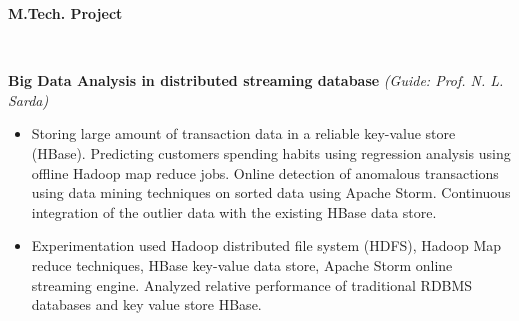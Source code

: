 \documentclass[a4paper,11pt]{article}
\newcommand{\lsep}{-0.5cm}
\newcommand{\resheading}[1]{{\small \colorbox{mygrey}{\begin{minipage}{0.975\textwidth}{\textbf{#1 \vphantom{p\^{E}}}}\end{minipage}}}}
\begin{document}
\resheading{\textbf{\large M.Tech. Project} }\\[\lsep]
\begin{description}
\item  \hspace{0.65 cm} 
 \textbf{Big Data Analysis in distributed streaming database}%
\textit{(Guide: Prof. N. L. Sarda)}
      \begin{itemize}
	  \item Storing large amount of transaction data in a reliable key-value store (HBase). Predicting customers spending habits using regression analysis using offline Hadoop map reduce jobs. Online detection of anomalous transactions using data mining techniques on sorted data using Apache Storm. Continuous integration of the outlier data with the existing HBase data store. 
	  \item Experimentation used Hadoop distributed file system (HDFS), Hadoop Map reduce techniques, HBase key-value data store, Apache Storm online streaming engine. Analyzed relative performance of traditional RDBMS databases and key value store HBase.
	    
 \end{itemize}

\end{description}
\end{document}

